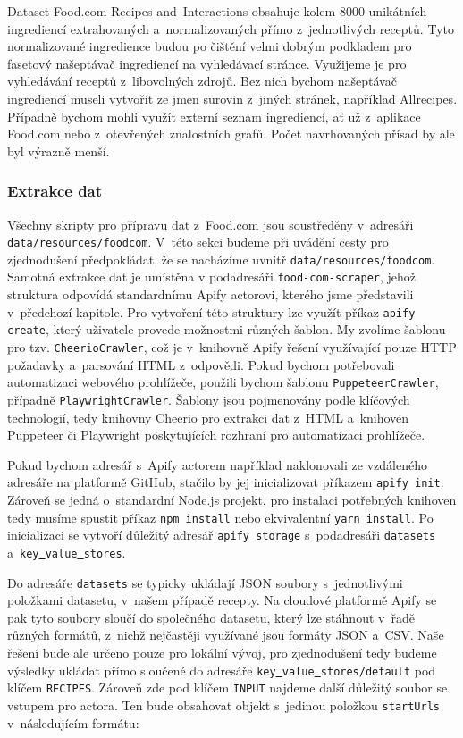 Dataset Food.com Recipes and~Interactions obsahuje kolem $8000$ unikátních ingrediencí extrahovaných a~normalizovaných přímo z~jednotlivých receptů. Tyto normalizované ingredience budou po čištění velmi dobrým podkladem pro fasetový našeptávač ingrediencí na vyhledávací stránce. Využijeme je pro vyhledávání receptů z~libovolných zdrojů. Bez nich bychom našeptávač ingrediencí museli vytvořit ze jmen surovin z~jiných stránek, například Allrecipes. Případně bychom mohli využít externí seznam ingrediencí, ať už z~aplikace Food.com nebo z~otevřených znalostních grafů. Počet navrhovaných přísad by ale byl výrazně menší.

\subsubsection{Extrakce dat}

Všechny skripty pro přípravu dat z~Food.com jsou soustředěny v~adresáři \texttt{data/resources/foodcom}. V~této sekci budeme při uvádění cesty pro zjednodušení předpokládat, že se nacházíme uvnitř \texttt{data/resources/foodcom}. Samotná extrakce dat je umístěna v podadresáři \texttt{food-com-scraper}, jehož struktura odpovídá standardnímu Apify actorovi, kterého jsme představili v~předchozí kapitole. Pro vytvoření této struktury lze využít příkaz \texttt{apify\,create}, který uživatele provede možnostmi různých šablon. My zvolíme šablonu pro tzv. \texttt{CheerioCrawler}, což je v~knihovně Apify řešení využívající pouze HTTP požadavky a~parsování HTML z~odpovědi. Pokud bychom potřebovali automatizaci webového prohlížeče, použili bychom šablonu \texttt{PuppeteerCrawler}, případně \texttt{PlaywrightCrawler}. Šablony jsou pojmenovány podle klíčových technologií, tedy knihovny Cheerio pro extrakci dat z~HTML a~knihoven Puppeteer či Playwright poskytujících rozhraní pro automatizaci prohlížeče.

Pokud bychom adresář s~Apify actorem například naklonovali ze vzdáleného adresáře na platformě GitHub, stačilo by jej inicializovat příkazem \texttt{apify\,init}. Zároveň se jedná o~standardní Node.js projekt, pro instalaci potřebných knihoven tedy musíme spustit příkaz \texttt{npm\,install} nebo ekvivalentní \texttt{yarn\,install}. Po inicializaci se vytvoří důležitý adresář \texttt{apify\underline{{ }}storage} s~podadresáři \texttt{datasets} a~\texttt{key\underline{{ }}value\underline{{ }}stores}.

Do adresáře \texttt{datasets} se typicky ukládají JSON soubory s~jednotlivými položkami datasetu, v~našem případě recepty. Na cloudové platformě Apify se pak tyto soubory sloučí do společného datasetu, který lze stáhnout v~řadě různých formátů, z~nichž nejčastěji využívané jsou formáty JSON a~CSV. Naše řešení bude ale určeno pouze pro lokální vývoj, pro zjednodušení tedy budeme výsledky ukládat přímo sloučené do adresáře \texttt{key\underline{{ }}value\underline{{ }}stores/default} pod klíčem \texttt{RECIPES}. Zároveň zde pod klíčem \texttt{INPUT} najdeme další důležitý soubor se vstupem pro actora. Ten bude obsahovat objekt s~jedinou položkou \texttt{startUrls} v~následujícím formátu:

